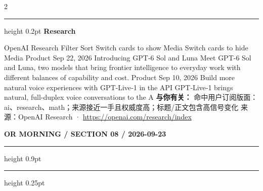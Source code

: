 \documentclass[10.5pt]{ctexart}
\begin{document}
\begin{multicols}{2}
\vspace{2mm}
\hrule height 0.2pt
\vspace{2mm}
{\large\bfseries Research}\par
OpenAI Research Filter Sort Switch cards to show Media Switch cards to hide Media Product Sep 22, 2026 Introducing GPT-6 Sol and Luna Meet GPT-6 Sol and Luna, two models that bring frontier intelligence to everyday work with different balances of capability and cost. Product Sep 10, 2026 Build more natural voice experiences with GPT‑Live‑1 in the API GPT‑Live‑1 brings natural, full-duplex voice conversations to the A
\textbf{与你有关：} 命中用户订阅版面：ai、research、math；来源接近一手且权威度高；标题/正文包含高信号变化
{\footnotesize\color{ormuted} 来源：OpenAI Research · \url{https://openai.com/research/index}}
\end{multicols}
\newpage
{\small\bfseries OR MORNING / SECTION 08 / 2026-09-23}
\vspace{2mm}
\hrule height 0.9pt
\vspace{1.5mm}
\hrule height 0.25pt
\vspace{4mm}
\end{document}
